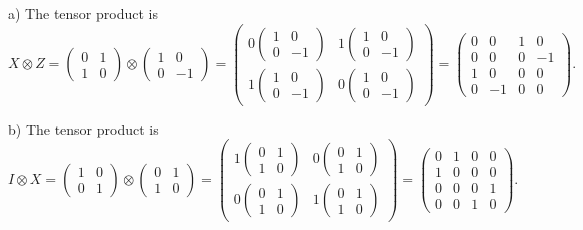 \documentclass{article}
\newcommand{\0}{{$|0\rangle$}}
\newcommand{\1}{{$|1\rangle$}}
\begin{document}
a) The tensor product is  
$$
X \otimes Z = \begin{pmatrix} 0 & 1 \\ 1 & 0 \end{pmatrix} \otimes \begin{pmatrix} 1 & 0 \\ 0 & -1 \end{pmatrix} = \begin{pmatrix} 0 \begin{pmatrix} 1 & 0 \\ 0 & -1 \end{pmatrix} & 1 \begin{pmatrix} 1 & 0 \\ 0 & -1 \end{pmatrix} \\ 1 \begin{pmatrix} 1 & 0 \\ 0 & -1 \end{pmatrix} & 0 \begin{pmatrix} 1 & 0 \\ 0 & -1 \end{pmatrix} \end{pmatrix} = \begin{pmatrix} 0 & 0 & 1 & 0 \\ 0 & 0 & 0 & -1 \\ 1 & 0 & 0 & 0 \\ 0 & -1 & 0 & 0 \end{pmatrix}.
$$

b) The tensor product is  
$$
I \otimes X = \begin{pmatrix} 1 & 0 \\ 0 & 1 \end{pmatrix} \otimes \begin{pmatrix} 0 & 1 \\ 1 & 0 \end{pmatrix} = \begin{pmatrix} 1 \begin{pmatrix} 0 & 1 \\ 1 & 0 \end{pmatrix} & 0 \begin{pmatrix} 0 & 1 \\ 1 & 0 \end{pmatrix} \\ 0 \begin{pmatrix} 0 & 1 \\ 1 & 0 \end{pmatrix} & 1 \begin{pmatrix} 0 & 1 \\ 1 & 0 \end{pmatrix} \end{pmatrix} = \begin{pmatrix} 0 & 1 & 0 & 0 \\ 1 & 0 & 0 & 0 \\ 0 & 0 & 0 & 1 \\ 0 & 0 & 1 & 0 \end{pmatrix}.
$$
\end{document}
